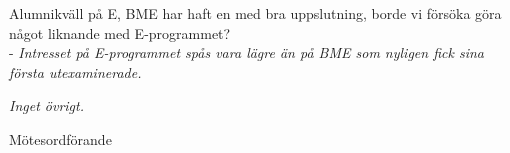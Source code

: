 \documentclass[10pt]{article}
\def\mo{Pontus Landgren}
\begin{document}
\begin{paragrafer}
\item Alumnikväll på E, BME har haft en med bra uppslutning, borde vi försöka göra något liknande med E-programmet?\\ - \textit{Intresset på E-programmet spås vara lägre än på BME som nyligen fick sina första utexaminerade.}

\textit{Inget övrigt.}
\end{paragrafer}

\hidesignfoot
\begin{signatures}{1}
\signature{\mo}{Mötesordförande}
\end{signatures}
\end{document}
